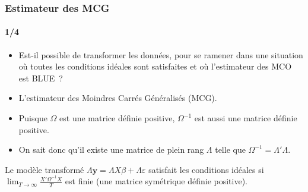\documentclass[10pt]{beamer}
\begin{document}
\begin{frame}
  \frametitle{Estimateur des MCG}
  \framesubtitle{1/4}

  \begin{itemize}

  \item Est-il possible de transformer les données, pour se ramener dans une situation où toutes les conditions idéales sont satisfaites et où l'estimateur des MCO est BLUE~?\newline

  \item[$\Rightarrow$] L'estimateur des Moindres Carrés Généralisés (MCG).\newline

  \item Puisque $\Omega$ est une matrice définie positive, $\Omega^{-1}$ est aussi une matrice définie positive.\newline

  \item On sait donc qu'il existe une matrice de plein rang $\Lambda$ telle que $\Omega^{-1} = \Lambda'\Lambda$.\newline

  \end{itemize}


  \begin{prop}\label{prop:mcg}
    Le modèle transformé $\Lambda \mathbf y = \Lambda X \beta + \Lambda\varepsilon$ satisfait les conditions idéales si $\lim_{T\rightarrow\infty}\frac{X'\Omega^{-1}X}{T}$ est finie (une matrice symétrique définie positive).
  \end{prop}


\end{frame}
\end{document}
